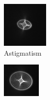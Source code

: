 \documentclass[a4paper,12pt]{article}
\begin{document}
\begin{figure}[H]
        \centering
        \begin{subfigure}{0.3\textwidth}
                \includegraphics[width=\textwidth]{astig_1}
                \caption{Astigmatism}
                \label{fig:astig1}
        \end{subfigure}
        \begin{subfigure}{0.3\textwidth}
                \includegraphics[width=\textwidth]{astig_2}

\end{subfigure}
\end{figure}
\end{document}

